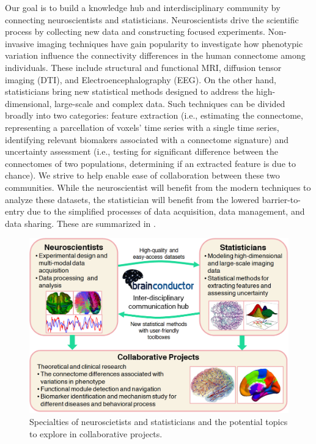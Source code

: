 \documentclass{nature}
\begin{document}
Our goal is to %
build a knowledge hub and interdisciplinary community by connecting
neuroscientists and statisticians.  Neuroscientists
drive the scientific process by collecting new data and constructing focused
experiments. Non-invasive imaging techniques have gain popularity to
investigate how phenotypic variation
influence the connectivity differences in the human
connectome among individuals\cite{sporns2005human,sporns2011human}. These
include structural and functional MRI,
diffusion tensor imaging (DTI), and Electroencephalography
(EEG).
On
the other hand, statisticians bring new statistical methods
designed to address the high-dimensional, large-scale and complex
data. Such techniques can be divided broadly into
two categories:
feature extraction (i.e., estimating the connectome, representing
a parcellation of voxels' time series with a single time series,
identifying relevant biomakers associated with a connectome signature)
and uncertainty assessment (i.e., testing for significant difference
between the connectomes of two populations, determining if 
an extracted feature is due to chance).
We strive to help enable ease of collaboration between these two communities.
While the neuroscientist will benefit from the modern techniques to
analyze these datasets, the statistician
will benefit from the lowered barrier-to-entry
due to the  simplified processes of data acquisition, data management, and data
sharing. These are summarized in .

\begin{figure}[tb]
\centering
\includegraphics[width=400pt]{fig/brainconductor/Brainconductor_overview.png}
\caption{Specialties of neuroscietists and statisticians and the potential
topics to explore in collaborative projects.}
\label{fig:overview}
\end{figure}
\end{document}
